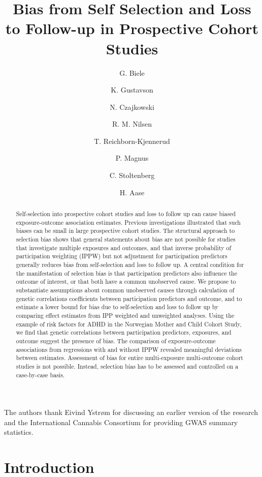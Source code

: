 \documentclass[12pt]{article}
\title{Bias from Self Selection and Loss to Follow-up in Prospective Cohort Studies}
\author{G. Biele \and K. Gustavson \and N. Czajkowski \and R. M. Nilsen \and T. Reichborn-Kjennerud \and P. Magnus \and C. Stoltenberg \and H. Aase}
\begin{document}
		\begin{titlepage}
			\maketitle
			\begin{abstract}
				Self-selection into prospective cohort studies and loss to follow up can cause biased exposure-outcome association estimates. Previous investigations illustrated that such biases can be small in large prospective cohort studies. The structural approach to selection bias shows that general statements about bias are not possible for studies that investigate multiple exposures and outcomes, and that inverse probability of participation weighting (IPPW) but not adjustment for participation predictors generally reduces bias from self-selection and loss to follow up. A central condition for the manifestation of selection bias is that participation predictors also influence the outcome of interest, or that both have a common unobserved cause.  We propose to substantiate assumptions about common unobserved causes through calculation of genetic correlations coefficients between participation predictors and outcome, and to estimate a lower bound for bias due to self-selection and loss to follow up by comparing effect estimates from IPP weighted and unweighted analyses. Using the example of risk factors for ADHD in the Norwegian Mother and Child Cohort Study, we find that genetic correlations between participation predictors, exposures, and outcome suggest the presence of bias. The comparison of exposure-outcome associations from regressions with and without IPPW revealed meaningful deviations between estimates. Assessment of bias for entire multi-exposure multi-outcome cohort studies is not possible. Instead, selection bias has to be assessed and controlled on a case-by-case basis.
			\end{abstract}
			
			
			The authors thank Eivind Ystrøm for discussing an earlier version of the research and the International Cannabis Consortium for providing GWAS summary statistics.
		\end{titlepage}


\section{Introduction}
\end{document}
